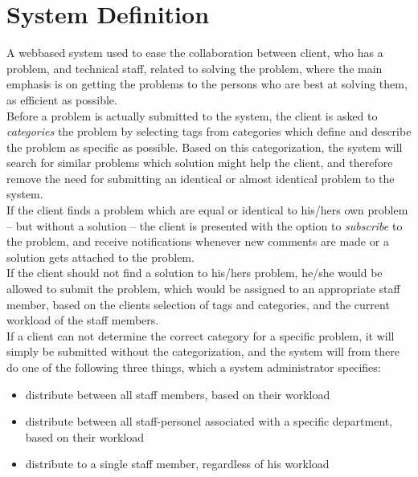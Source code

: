\section{System Definition}
\label{sec:systemdefinition}

A webbased system used to ease the collaboration between client, who has a problem, and technical staff, related to solving the problem, where the main emphasis is on getting the problems to the persons who are best at solving them, as efficient as possible. \\


Before a problem is actually submitted to the system, the client is asked to \textit{categories} the problem by selecting tags from categories which define and describe the problem as specific as possible. Based on this categorization, the system will search for similar problems which solution might help the client, and therefore remove the need for submitting an identical or almost identical problem to the system.\\

If the client finds a problem which are equal or identical to his/hers own problem -- but without a solution -- the client is presented with the option to \textit{subscribe} to the problem, and receive notifications whenever new comments are made or a solution gets attached to the problem. \\

If the client should not find a solution to his/hers problem, he/she would be allowed to submit the problem, which would be assigned to an appropriate staff member, based on the clients selection of tags and categories, and the current workload of the staff members. \\

If a client can not determine the correct category for a specific problem, it will simply be submitted without the categorization, and the system will from there do one of the following three things, which a system administrator specifies:

\begin{itemize}
	\item distribute between all staff members, based on their workload
	\item distribute between all staff-personel associated with a specific department, based on their workload
	\item distribute to a single staff member, regardless of his workload
\end{itemize}

